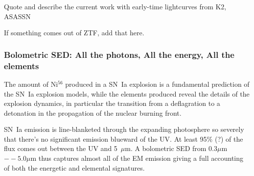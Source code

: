{\tbd Quote and describe the current work with early-time lightcurves from K2, ASASSN}

{\tbd If something comes out of ZTF, add that here.}

\subsubsection{Bolometric SED: All the photons, All the energy, All the elements}
The amount of Ni$^{56}$ produced in a SN~Ia explosion is a fundamental prediction of the SN~Ia explosion models, while the elements produced reveal the details of the explosion dynamics, in particular the transition from a deflagration to a detonation in the propagation of the nuclear burning front.

SN~Ia emission is line-blanketed through the expanding photosphere so severely that there's no significant emission blueward of the UV.  At least 95\% (?) of the flux comes out between the UV and 5~$\mu$m.  A bolometric SED from $0.3\mu$m$--5.0\mu$m thus captures almost all of the EM emission giving a full accounting of both the energetic and elemental signatures.
